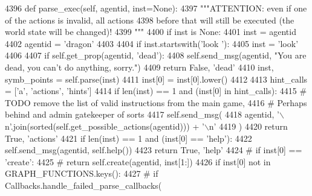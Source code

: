 \begin{DoxyCode}
4396     \textcolor{keyword}{def }parse\_exec(self, agentid, inst=None):
4397         \textcolor{stringliteral}{"""ATTENTION: even if one of the actions is invalid, all actions}
4398 \textcolor{stringliteral}{        before that will still be executed (the world state will be changed)!}
4399 \textcolor{stringliteral}{        """}
4400         \textcolor{keywordflow}{if} inst \textcolor{keywordflow}{is} \textcolor{keywordtype}{None}:
4401             inst = agentid
4402             agentid = \textcolor{stringliteral}{'dragon'}
4403 
4404         \textcolor{keywordflow}{if} inst.startswith(\textcolor{stringliteral}{'look '}):
4405             inst = \textcolor{stringliteral}{'look'}
4406 
4407         \textcolor{keywordflow}{if} self.get\_prop(agentid, \textcolor{stringliteral}{'dead'}):
4408             self.send\_msg(agentid, \textcolor{stringliteral}{"You are dead, you can't do anything, sorry."})
4409             \textcolor{keywordflow}{return} \textcolor{keyword}{False}, \textcolor{stringliteral}{'dead'}
4410         inst, symb\_points = self.parse(inst)
4411         inst[0] = inst[0].lower()
4412 
4413         hint\_calls = [\textcolor{stringliteral}{'a'}, \textcolor{stringliteral}{'actions'}, \textcolor{stringliteral}{'hints'}]
4414         \textcolor{keywordflow}{if} len(inst) == 1 \textcolor{keywordflow}{and} (inst[0] \textcolor{keywordflow}{in} hint\_calls):
4415             \textcolor{comment}{# TODO remove the list of valid instructions from the main game,}
4416             \textcolor{comment}{# Perhaps behind and admin gatekeeper of sorts}
4417             self.send\_msg(
4418                 agentid, \textcolor{stringliteral}{'\(\backslash\)n'}.join(sorted(self.get\_possible\_actions(agentid))) + \textcolor{stringliteral}{'\(\backslash\)n'}
4419             )
4420             \textcolor{keywordflow}{return} \textcolor{keyword}{True}, \textcolor{stringliteral}{'actions'}
4421         \textcolor{keywordflow}{if} len(inst) == 1 \textcolor{keywordflow}{and} (inst[0] == \textcolor{stringliteral}{'help'}):
4422             self.send\_msg(agentid, self.help())
4423             \textcolor{keywordflow}{return} \textcolor{keyword}{True}, \textcolor{stringliteral}{'help'}
4424         \textcolor{comment}{# if inst[0] == 'create':}
4425         \textcolor{comment}{#     return self.create(agentid, inst[1:])}
4426         \textcolor{keywordflow}{if} inst[0] \textcolor{keywordflow}{not} \textcolor{keywordflow}{in} GRAPH\_FUNCTIONS.keys():
4427             \textcolor{comment}{# if Callbacks.handle\_failed\_parse\_callbacks(}

\end{DoxyCode}
